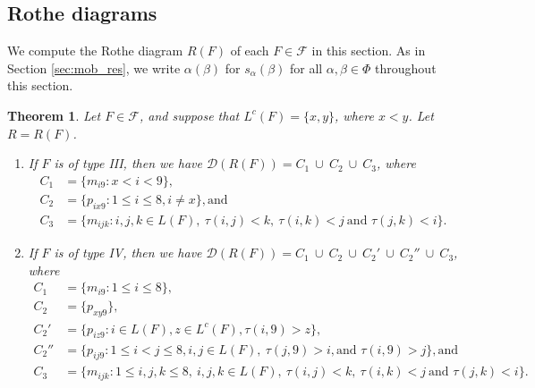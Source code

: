 \documentclass[11pt]{amsart}
\theoremstyle{plain}
\newtheorem{theorem}{Theorem}[section]
\theoremstyle{definition}
\theoremstyle{remark}
\numberwithin{equation}{section}
\newcommand{\al}{\alpha}
\newcommand{\be}{\beta}
\newcommand{\res}{\mathscr{D}}
\newcommand{\lc}{L^c}
\newcommand{\calf}{\mathcal{F}}
\newcommand{\mr}{m}
\newcommand{\pr}{p}
\begin{document}
\subsection{Rothe diagrams}
\label{sec:fob_res}
We compute the Rothe diagram $R(F)$ of each $F\in \calf$ in this section. As in
Section \ref{sec:mob_res}, we write $\al(\be)$ for $s_\al(\be)$ for all
$\al,\be\in \Phi$ throughout this section. 

\begin{theorem}
\label{thm:fob_res}
Let $F\in \calf$, and suppose that $\lc(F)=\{x,y\}$, where $x<y$. Let $R=R(F)$.
\begin{enumerate}
\item If $F$ is of type III, then we have 
$\res(R(F)) = C_1 \ \cup\ C_2 \ \cup\ C_3$, where 
\begin{align*}
C_1 &= \{\mr_{i9} : x < i < 9\},\\
C_2 &= \{\pr_{ix9} : 1\le i\le 8, i\neq x\},
\text{and}\\ 
C_3 &= \{\mr_{ijk} : i, j, k \in L(F), \ \tau(i, j)<k, \ \tau(i, k)<j\ 
\text{and\ } \tau(j, k)<i\}.
\end{align*}
\item If $F$ is of type IV, then we have $\res(R(F)) = C_1 \ \cup\ C_2
  \ \cup\ C_2'\ \cup\ C_2''\ \cup\ C_3$, where 
  \begin{align*}
C_1 &= \{\mr_{i9} : 1 \leq i \le 8\},\\
C_2 &= \{p_{xy9}\}, \\
C_2' & = \{p_{iz9}: i\in L(F), z\in \lc(F), \tau(i,9)>z\},\\
C_2'' &=\{
  \pr_{ij9} : 1 \leq i < j \leq 8, i,j\in L(F), \ \tau(j, 9)>i, \text{and } \tau(i,
9)>j\}, \text{and}\\ 
C_3 &= \{\mr_{ijk} : 1\le i,j,k\le 8,\ i,j,k\in L(F), \ \tau(i, j)<k, \
  \tau(i, k)<j\ 
\text{and\ } \tau(j, k)<i\}.
\end{align*}
\end{enumerate}
\end{theorem}
\end{document}
